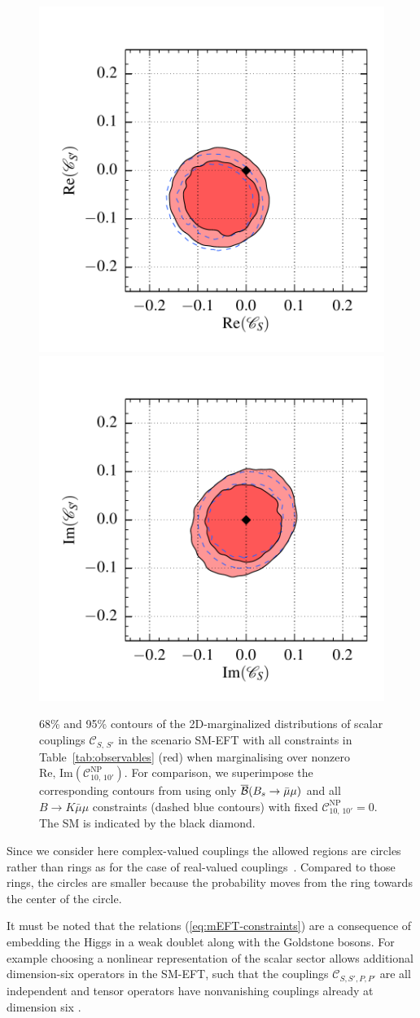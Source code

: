 \documentclass[twocolumn,epjc3]{svjour3}
\numberwithin{equation}{section}
\def \refeq#1{(\ref{#1})}
\def \reftab#1{Table~\ref{#1}}
\newcommand{\checked}[1]{{\color{brown}{ {\bf Checked: }{#1}}}}
\renewcommand{\checked}[1]{#1}
\newcommand{\wilson}[2][{}]{\mathcal{C}_{#2}^{\mathrm{#1}}}
\renewcommand{\[}{\big[}
\renewcommand{\]}{\big]}
\renewcommand{\(}{\big(}
\renewcommand{\)}{\big)}
\begin{document}
\begin{figure}
  \begin{center}
      \includegraphics[width=.35\textwidth]{plots/pdf/smEFTS_K_Bsmumu,smEFTS10_K_KstarBR_Bsmumu_0,2}
      \includegraphics[width=.35\textwidth]{plots/pdf/smEFTS_K_Bsmumu,smEFTS10_K_KstarBR_Bsmumu_1,3}
    \end{center}
    \caption{ 68\% and 95\% contours of the 2D-marginalized distributions of
      scalar couplings $\wilson{S,\,S'}$ in the scenario SM-EFT with all
      constraints in \reftab{tab:observables} (red) when marginalising over
      nonzero $\mbox{Re, Im} (\wilson[NP]{10,\,10'})$.  For comparison, we
      superimpose the corresponding contours from using only $\overline{\cal
        B}(B_s\to \bar\mu\mu)$ and all {$B \to K \bar\mu\mu$} constraints
      (dashed blue contours) with fixed $\wilson[NP]{10,\,10'} = 0$.  The SM is
      indicated by the black diamond.  \checked{}}
  \label{fig:scalar:SM-EFT}
\end{figure}

Since we consider here complex-valued couplings the allowed regions are circles
rather than rings as for the case of real-valued
couplings~\cite{Alonso:2014csa}. Compared to those rings, the circles are
smaller because the probability moves from the ring towards the center of the
circle.

It must be noted that the relations \refeq{eq:mEFT-constraints} are a
consequence of embedding the Higgs in a weak doublet along with the Goldstone
bosons.  For example choosing a nonlinear representation of the scalar sector
allows additional dimension-six operators in the SM-EFT, such that the couplings
$\wilson{S,S',P,P'}$ are all independent and tensor operators have nonvanishing
couplings already at dimension six \cite{Cata:2015lta}.
\end{document}
